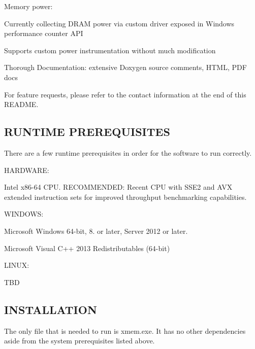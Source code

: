 Memory power\-:
\begin{DoxyItemize}
\item Currently collecting D\-R\-A\-M power via custom driver exposed in Windows performance counter A\-P\-I
\item Supports custom power instrumentation without much modification
\item Thorough Documentation\-: extensive Doxygen source comments, H\-T\-M\-L, P\-D\-F docs
\end{DoxyItemize}

For feature requests, please refer to the contact information at the end of this R\-E\-A\-D\-M\-E. 

 \subsection*{R\-U\-N\-T\-I\-M\-E P\-R\-E\-R\-E\-Q\-U\-I\-S\-I\-T\-E\-S }

There are a few runtime prerequisites in order for the software to run correctly.

H\-A\-R\-D\-W\-A\-R\-E\-:


\begin{DoxyItemize}
\item Intel x86-\/64 C\-P\-U. R\-E\-C\-O\-M\-M\-E\-N\-D\-E\-D\-: Recent C\-P\-U with S\-S\-E2 and A\-V\-X extended instruction sets for improved throughput benchmarking capabilities.
\end{DoxyItemize}

W\-I\-N\-D\-O\-W\-S\-:


\begin{DoxyItemize}
\item Microsoft Windows 64-\/bit, 8. or later, Server 2012 or later.
\item Microsoft Visual C++ 2013 Redistributables (64-\/bit)
\end{DoxyItemize}

L\-I\-N\-U\-X\-:


\begin{DoxyItemize}
\item T\-B\-D 

 \subsection*{I\-N\-S\-T\-A\-L\-L\-A\-T\-I\-O\-N }
\end{DoxyItemize}

The only file that is needed to run is xmem.\-exe. It has no other dependencies aside from the system prerequisites listed above. 

